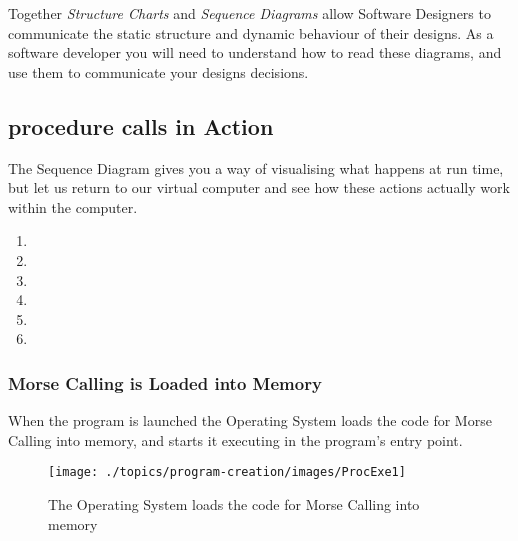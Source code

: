 \bigskip

Together \emph{Structure Charts} and \emph{Sequence Diagrams} allow Software Designers to communicate the static structure and dynamic behaviour of their designs. As a software developer you will need to understand how to read these diagrams, and use them to communicate your designs decisions.


\subsection{procedure calls in Action} %
\label{sub:procedure_calls_in_action}

The Sequence Diagram gives you a way of visualising what happens at run time, but let us return to our virtual computer and see how these actions actually work within the computer. 

\begin{enumerate}
  \item {}
  \item {}
  \item {}
  \item {}
  \item {}
  \item {}
\end{enumerate}

\clearpage
\subsubsection{Morse Calling is Loaded into Memory} %
\label{ssub:morse_calling_is_loaded_into_memory}

When the program is launched the Operating System loads the code for Morse Calling into memory, and starts it executing in the program's entry point. 

\begin{figure}[htbp]
   \centering
   \texttt{[image: ./topics/program-creation/images/ProcExe1]} 
   \caption{The Operating System loads the code for Morse Calling into memory}
   \label{fig:procedure-decl-visualise-morsecalling-1}
\end{figure}

